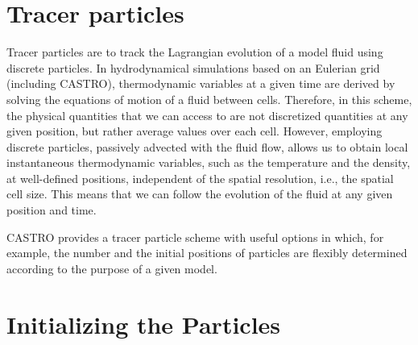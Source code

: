 



\section{Tracer particles}

Tracer particles are to track the Lagrangian evolution of a model fluid using discrete particles. In hydrodynamical simulations based on an Eulerian grid (including CASTRO), thermodynamic variables at a given time are derived by solving the equations of motion of a fluid between cells. Therefore, in this scheme, the physical quantities that we can access to are not discretized quantities at any given position, but rather average values over each cell. However, employing discrete particles, passively advected with the fluid flow, allows us to obtain local instantaneous thermodynamic variables, such as the temperature and the density, at well-defined positions, independent of the spatial resolution, i.e., the spatial cell size. This means that we can follow the evolution of the fluid at any given position and time. 

\noindent CASTRO provides a tracer particle scheme with useful options in which, for example, the number and the initial positions of particles are flexibly determined according to the purpose of a given model. 


\section{Initializing the Particles}

